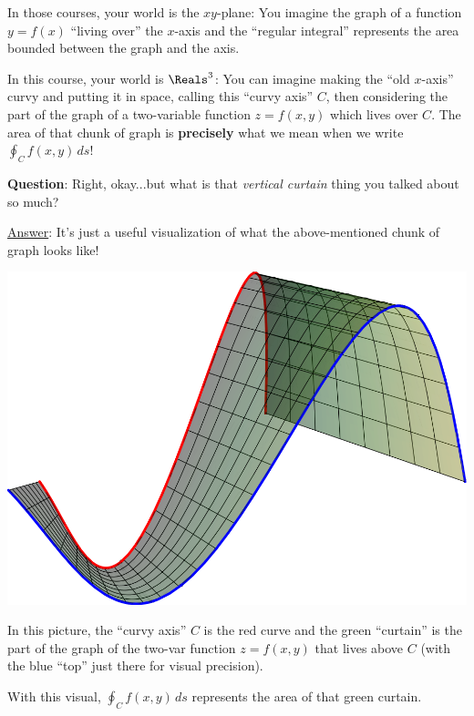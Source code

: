 \documentclass[12pt]{article}
\renewcommand{\Q}{\vspace{4.5mm}\noindent\textbf{Question}: }
\newcommand{\Ans}{\ul{Answer}: }
\begin{document}
	In those courses, your world is the $xy$-plane: You imagine the graph of a function $y=f(x)$ ``living over'' the $x$-axis and the ``regular integral'' represents the area bounded between the graph and the axis.

	In this course, your world is $\Reals^3$: You can imagine making the ``old $x$-axis'' curvy and putting it in space, calling this ``curvy axis'' $C$, then considering the part of the graph of a two-variable function $z=f(x,y)$ which lives over $C$. The area of that chunk of graph is \textbf{precisely} what we mean when we write $\oint_C f(x,y)\,ds$!
	
	\Q Right, okay...but what is that \textit{vertical curtain} thing you talked about so much?
	
	\Ans It's just a useful visualization of what the above-mentioned chunk of graph looks like!
	\begin{minipage}{0.45\linewidth}
		\vspace{-9mm}
		\begin{center}
			\includegraphics[scale=0.2]{calc2_smol}
		\end{center}
	\end{minipage}
	\begin{minipage}[b]{0.5\linewidth}
		\vspace{3mm}
		In this picture, the ``curvy axis'' $C$ is the red curve and the green ``curtain'' is the part of the graph of the two-var function $z=f(x,y)$ that lives above $C$ (with the blue ``top'' just there for visual precision).\par \vspace{3mm}
		
		With this visual, $\oint_C f(x,y)\,ds$ represents the area of that green curtain.
	\end{minipage}
\end{document}
